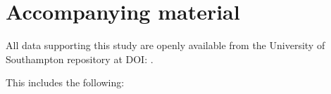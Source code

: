 \pagestyle{plain}
\chapter*{Accompanying material}

All data supporting this study are openly available from the University of Southampton repository at DOI: .

\noindent This includes the following:

\cleardoublepage